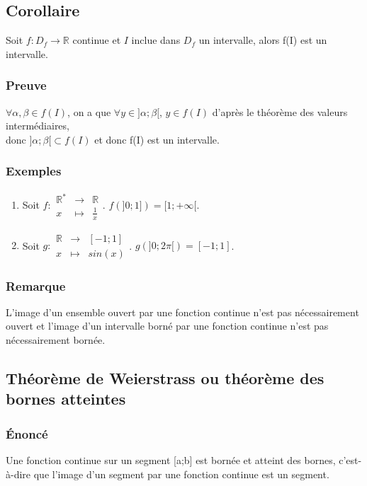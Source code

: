 \documentclass[a4paper,10pt]{book} %
\newcommand{\R}{\mathbb{R}}
\begin{document}
\subsection{Corollaire}
Soit $f : D_{f}\rightarrow \R$ continue et $I$ inclue dans $D_{f}$ un intervalle, alors f(I) est un intervalle.

\subsubsection{Preuve}
$\forall \alpha,\beta \in f(I)$, on a que $\forall y\in ]\alpha;\beta[$, $y\in f(I)$ d'après le théorème des valeurs intermédiaires,\\
donc $]\alpha;\beta[\subset f(I)$ et donc f(I) est un intervalle.

\subsubsection{Exemples}
\begin{enumerate} \item Soit $f:\begin{array}{rcl} \R^{*}&\rightarrow& \R \\
x&\mapsto &\frac{1}{x} \end{array}$. $f(]0;1])=[1;+\infty[$.

\item Soit $g:\begin{array}{rcl} \R&\rightarrow& [-1;1] \\
x&\mapsto& sin(x) \end{array}$. $g(]0;2\pi[)=[-1;1]$. \end{enumerate}

\subsubsection{Remarque}
L'image d'un ensemble ouvert par une fonction continue n'est pas nécessairement ouvert et l'image d'un intervalle borné par une fonction continue n'est pas nécessairement bornée.

\newpage

\subsection{Théorème de Weierstrass ou théorème des bornes atteintes}
\subsubsection{Énoncé}
Une fonction continue sur un segment [a;b] est bornée et atteint des bornes, c'est-à-dire que l'image d'un segment par une fonction continue est un segment.
\end{document}

